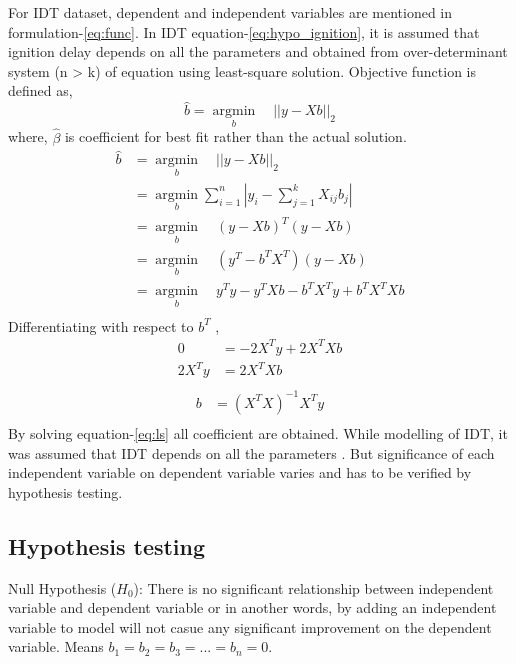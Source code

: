\documentclass[preprint,12pt]{elsarticle}
\begin{document}
				 
				  For IDT dataset, dependent and independent variables are mentioned in formulation-\ref{eq:func}. In IDT equation-\ref{eq:hypo_ignition}, it is assumed that ignition delay depends on all the parameters and obtained from over-determinant system (n > k) of equation using least-square solution.
				  Objective function is defined as,
				  \begin{equation}
				  	\hat{b} =  \operatorname*{argmin}_b   \quad || {y- Xb}||_2
				  \end{equation}
				where, $\hat{\beta}$ is coefficient for best fit rather than the actual solution.
				 \begin{equation}
				 \begin{aligned}
				 \hat{b} &=  \operatorname*{argmin}_b   \quad || y- Xb||_2 \\
				 &=  \operatorname*{argmin}_b  \sum_{i=1}^{n} |y_i - \sum_{j=1}^{k}X_{ij}
				 b_j|\\
				 &=  \operatorname*{argmin}_b  
				 \quad (y- Xb)^T(y- Xb) \\
				 &=  \operatorname*{argmin}_b \quad (y^T- b^TX^T) (y- Xb) \\
				 &=  \operatorname*{argmin}_b \quad y^Ty- y^TXb- b^TX^Ty+ b^TX^TXb \\				
				 \end{aligned}
				 \end{equation}
				 Differentiating  with respect to $b^T$ ,
				 \begin{equation}
				 \begin{aligned}
				 0  &=  -2X^Ty+2 X^TXb  \\
				 2X^Ty &= 2 X^TXb  \\
				 \end{aligned}
				 \end{equation}
				  \begin{equation}\label{eq:ls}
				  \begin{aligned}
				  b &= (X^TX)^{-1} X^Ty \\
				  \end{aligned}
				  \end{equation}
				 By solving equation-\ref{eq:ls} all coefficient are obtained. While modelling of IDT, it was assumed that IDT depends on all the parameters . But significance of each independent variable on dependent variable varies and has to be verified by hypothesis testing.
				 \subsection{Hypothesis testing}
				  Null Hypothesis ($H_0$): There is no significant relationship between independent variable and dependent variable or in another words,  by adding an independent variable to model will not casue any significant improvement on the dependent variable.
				  Means $b_1 = b_2 = b_3 = ... = b_n = 0$.
				  
\end{document}
